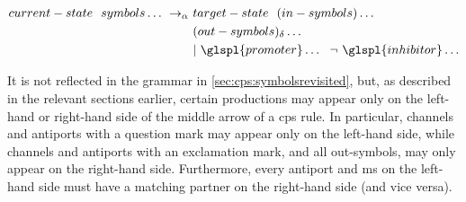 \begin{framed}
\vspace{-0.6cm}
\begin{align*}
 current-state  ~~  symbols  \dots ~ \rightarrow_\alpha ~ &  target-state  ~~ ( in-symbols ) \dots ~~ \\
 & ( out-symbols )_\delta \dots \\
 & | ~  \glspl{promoter} \dots ~~ \neg ~  \glspl{inhibitor} \dots
\end{align*}
\vspace{-0.8cm}
\end{framed}

It is not reflected in the grammar in \cref{sec:cps:symbolsrevisited}, but, as described in the relevant sections earlier, certain productions may appear only on the left-hand or right-hand side of the middle arrow of a \gls{cps} rule.  In particular, channels and antiports with a question mark may appear only on the left-hand side, while channels and antiports with an exclamation mark, and all out-symbols, may only appear on the right-hand side.  Furthermore, every antiport and \gls{ms} on the left-hand side must have a matching partner on the right-hand side (and vice versa).